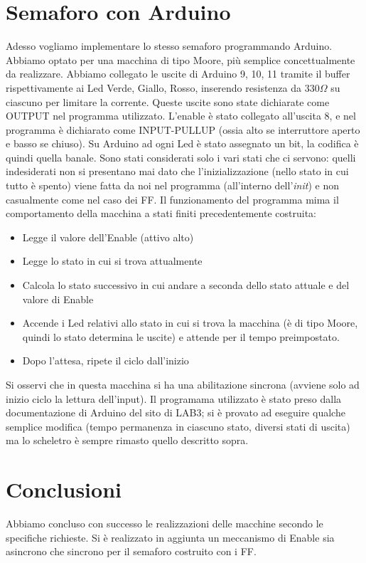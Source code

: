 \documentclass[10pt,a4paper]{article}
\begin{document}
\section{Semaforo con Arduino}
Adesso vogliamo implementare lo stesso semaforo programmando Arduino. Abbiamo optato per una macchina di tipo Moore, più semplice concettualmente da realizzare.
Abbiamo collegato le uscite di Arduino 9, 10, 11 tramite il buffer rispettivamente ai Led Verde, Giallo, Rosso, inserendo resistenza da $330\Omega$ su ciascuno per limitare la corrente.
Queste uscite sono state dichiarate come OUTPUT nel programma utilizzato.
L'enable è stato collegato all'uscita 8, e nel programma è dichiarato come INPUT-PULLUP (ossia alto se interruttore aperto e basso se chiuso).
Su Arduino ad ogni Led è stato assegnato un bit, la codifica è quindi quella banale. Sono stati considerati solo i vari stati che ci servono: quelli indesiderati non si presentano mai dato che l'inizializzazione (nello stato in cui tutto è spento) viene fatta da noi nel programma (all'interno dell'\emph{init}) e non casualmente come nel caso dei FF.
Il funzionamento del programma mima il comportamento della macchina a stati finiti precedentemente costruita:
\begin{itemize}
\item Legge il valore dell'Enable (attivo alto)
\item Legge lo stato in cui si trova attualmente
\item Calcola lo stato successivo in cui andare a seconda dello stato attuale e del valore di Enable
\item Accende i Led relativi allo stato in cui si trova la macchina (è di tipo Moore, quindi lo stato determina le uscite) e attende per il tempo preimpostato.
\item Dopo l'attesa, ripete il ciclo dall'inizio
\end{itemize}
Si osservi che in questa macchina si ha una abilitazione sincrona (avviene solo ad inizio ciclo la lettura dell'input).
Il programama utilizzato è stato preso dalla documentazione di Arduino del sito di LAB3; si è provato ad eseguire qualche semplice modifica (tempo permanenza in ciascuno stato, diversi stati di uscita) ma lo scheletro è sempre rimasto quello descritto sopra.
\section{Conclusioni}
Abbiamo concluso con successo le realizzazioni delle macchine secondo le specifiche richieste. Si è realizzato in aggiunta un meccanismo di Enable sia asincrono che sincrono per il semaforo costruito con i FF.
\end{document}
